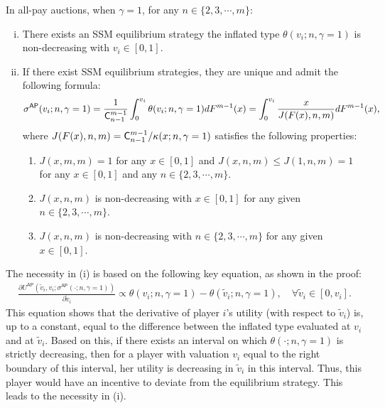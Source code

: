 \begin{proposition}
\label{prop:SSM_gamma_1_allpay}
In all-pay auctions, when $\gamma=1$, for any $n\in \{2,3,\cdots,m\}$:
\begin{enumerate}[(i)]
    \item There exists an SSM equilibrium strategy {} the inflated type $\theta(v_i;n,\gamma=1)$ is non-decreasing with $v_i\in [0,1]$.
    \item If there exist SSM equilibrium strategies, they are unique and admit the following formula:
    \begin{align}
    \label{eq:SSM_equilibrium_gamma_1_all_pay}
        \sigma^{\mathsf{AP}}(v_i;n,\gamma=1)
   = \frac{1}{\mathsf{C}^{m-1}_{n-1}}\int_0^{v_i}\theta(v_i;n,\gamma=1)dF^{m-1}(x)
   = \int_0^{v_i} \frac{x}{J(F(x),n,m)} dF^{m-1}(x),
    \end{align}
    where $J(F(x),n,m) = \mathsf{C}^{m-1}_{n-1}/\kappa(x;n,\gamma=1)$ satisfies the following properties:
    \begin{enumerate}
        \item $J(x,m,m)=1$ for any $x\in [0,1]$ and $J(x,n,m)\leq J(1,n,m) = 1$ for any $x\in[0,1]$ and any $n\in \{2,3,\cdots,m\}$.
        \item $J(x,n,m)$ is non-decreasing with $x\in [0,1]$ for any given $n\in \{2,3,\cdots,m\}$.
        \item $J(x,n,m)$ is non-decreasing with $n\in \{2,3,\cdots,m\}$ for any given $x\in[0,1]$.
    \end{enumerate}
\end{enumerate}
\end{proposition}




The necessity in  (i) is based on the following key equation, as shown in the proof:
\begin{align}
\nonumber
 \frac{\partial U^{\mathsf{AP}}(\tilde{v}_i,v_i;\sigma^{\mathsf{AP}}(\cdot;n,\gamma=1))}{\partial \tilde{v}_i}
  \propto \theta(v_i;n,\gamma=1) - \theta(\tilde{v}_i;n,\gamma=1),\quad \forall \tilde{v}_i\in [0,v_i].
\end{align}
This equation shows that the derivative of player $i$'s utility (with respect to $\tilde{v}_i$) is, up to a constant, equal to the difference between the inflated type evaluated at $v_i$ and at $\tilde{v}_i$. Based on this, if there exists an interval on which $\theta(\cdot;n,\gamma=1)$ is strictly decreasing, then for a player with valuation $v_i$ equal to the right boundary of this interval, her utility is decreasing in $\tilde{v}_i$ in this interval.
Thus, this player would have an incentive to deviate from the equilibrium strategy. 
This leads to the necessity in (i).


